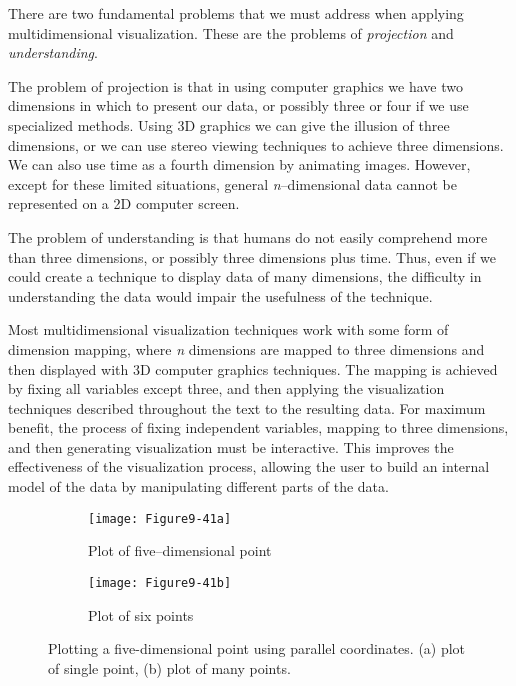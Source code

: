 There are two fundamental problems that we must address when applying multidimensional visualization. These are the problems of \emph{projection} and \emph{understanding}.

The problem of projection is that in using computer graphics we have two dimensions in which to present our data, or possibly three or four if we use specialized methods. Using 3D graphics we can give the illusion of three dimensions, or we can use stereo viewing techniques to achieve three dimensions. We can also use time as a fourth dimension by animating images. However, except for these limited situations, general \emph{n}--dimensional data cannot be represented on a 2D computer screen.

The problem of understanding is that humans do not easily comprehend more than three dimensions, or possibly three dimensions plus time. Thus, even if we could create a technique to display data of many dimensions, the difficulty in understanding the data would impair the usefulness of the technique.

Most multidimensional visualization techniques work with some form of dimension mapping, where \emph{n} dimensions are mapped to three dimensions and then displayed with 3D computer graphics techniques. The mapping is achieved by fixing all variables except three, and then applying the visualization techniques described throughout the text to the resulting data. For maximum benefit, the process of fixing independent variables, mapping to three dimensions, and then generating visualization must be interactive. This improves the effectiveness of the visualization process, allowing the user to build an internal model of the data by manipulating different parts of the data.

\begin{figure}[htb]
	\begin{subfigure}[h]{0.48\linewidth}
		\texttt{[image: Figure9-41a]}
		\captionsetup{justification=centering}
		\caption{Plot of five--dimensional point}
		\label{fig:Figure9-41a}
	\end{subfigure}
	\hfill
	\begin{subfigure}[h]{0.48\linewidth}
		\texttt{[image: Figure9-41b]}
		\captionsetup{justification=centering}
		\caption{Plot of six points}
		\label{fig:Figure9-41b}
	\end{subfigure}
	\caption{Plotting a five-dimensional point using parallel coordinates. (a) plot of single point, (b) plot of many points.}\label{fig:Figure9-41}
\end{figure}

